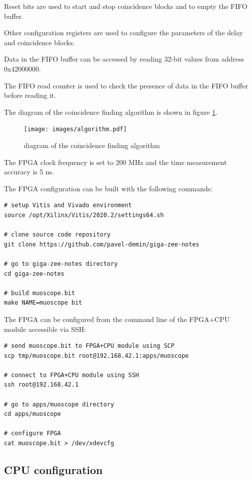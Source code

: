 \documentclass[12pt, a4paper]{article}
\begin{document}
Reset bits are used to start and stop coincidence blocks and to empty the FIFO buffer.

Other configuration registers are used to configure the parameters of the delay and coincidence blocks.

Data in the FIFO buffer can be accessed by reading 32-bit values from address 0x42000000.

The FIFO read counter is used to check the presence of data in the FIFO buffer before reading it.

The diagram of the coincidence finding algorithm is shown in figure \ref{fig:algorithm}.

\begin{figure}[h!]
  \centering
  \texttt{[image: images/algorithm.pdf]}
  \caption{diagram of the coincidence finding algorithm}
  \label{fig:algorithm}
\end{figure}

The FPGA clock frequency is set to 200 MHz and the time measurement accuracy is 5 ns.

The FPGA configuration can be built with the following commands:
\vspace{-1ex}
\begin{verbatim}
# setup Vitis and Vivado environment
source /opt/Xilinx/Vitis/2020.2/settings64.sh

# clone source code repository
git clone https://github.com/pavel-demin/giga-zee-notes

# go to giga-zee-notes directory
cd giga-zee-notes

# build muoscope.bit
make NAME=muoscope bit
\end{verbatim}

The FPGA can be configured from the command line of the FPGA+CPU module accessible via SSH:
\vspace{-1ex}
\begin{verbatim}
# send muoscope.bit to FPGA+CPU module using SCP
scp tmp/muoscope.bit root@192.168.42.1:apps/muoscope

# connect to FPGA+CPU module using SSH
ssh root@192.168.42.1

# go to apps/muoscope directory
cd apps/muoscope

# configure FPGA
cat muoscope.bit > /dev/xdevcfg
\end{verbatim}

\subsection{CPU configuration}
\end{document}

